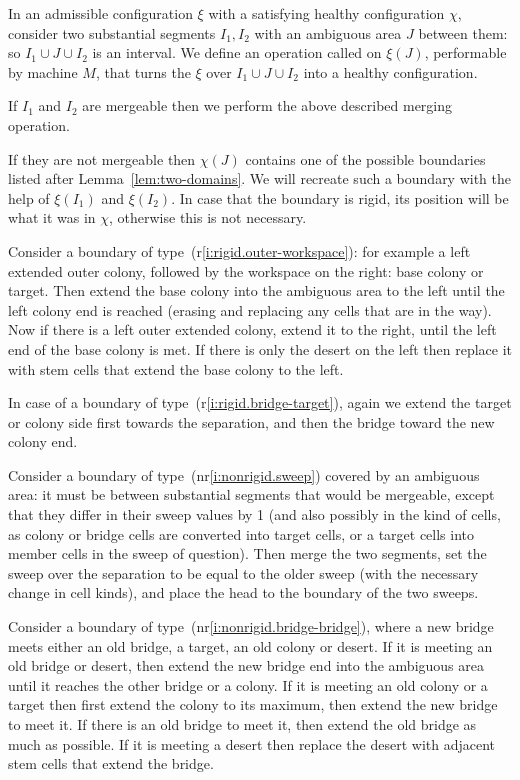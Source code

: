\documentclass[12pt]{memoir}
\begin{document}
\begin{definition}[Stitching]\label{def:stitching}
In an admissible configuration \( \xi \) with a satisfying healthy configuration \( \chi \),
consider two substantial segments \( I_{1},I_{2} \) with an ambiguous area \( J \) 
between them: so \( I_{1}\cup J\cup I_{2} \) is an interval.
We define an operation called 
on \( \xi(J) \), performable by machine \( M \), that turns the
\( \xi \) over  \( I_{1}\cup J\cup I_{2} \) into a healthy configuration.

If \( I_{1} \) and \( I_{2} \) are mergeable then we perform the above described merging operation.

If they are not mergeable then \( \chi(J) \) contains one of the possible boundaries
listed after Lemma~\ref{lem:two-domains}.
We will recreate such a boundary with the help of \( \xi(I_{1}) \) and \( \xi(I_{2}) \).
In case that the boundary is rigid, its position will be what it was in \( \chi \),
otherwise this is not necessary.

Consider a boundary of type~(r\ref{i:rigid.outer-workspace}): for example
a left extended outer colony, followed by the workspace on the right: base colony or target.
Then extend the base colony into the ambiguous area
to the left until the left colony end is reached
(erasing and replacing any cells that are in the way).
Now if there is a left outer extended colony, extend it to the right, until
the left end of the base colony is met.
If there is only the desert on the left then replace it with stem cells that extend the base
colony to the left.

In case of a boundary of type~(r\ref{i:rigid.bridge-target}),
again we extend the target or colony side first towards the separation,
and then the bridge toward the new colony end.

Consider a boundary of type~(nr\ref{i:nonrigid.sweep}) covered by an ambiguous
area: it must be between substantial segments that would be mergeable, except that they
differ in their sweep values by 1 (and also possibly in the kind of cells,
as colony or bridge cells are converted into target cells, or a target cells into member cells
in the sweep of question).
Then merge the two segments, set the sweep over the separation to be equal
to the older sweep (with the necessary change in cell kinds), 
and place the head to the boundary of the two sweeps.

Consider a boundary of type~(nr\ref{i:nonrigid.bridge-bridge}), where a new bridge
meets either an old bridge, a target, an old colony or desert.
If it is meeting an old bridge or desert, then
extend the new bridge end into the ambiguous area until it reaches the
other bridge or a colony.
If it is meeting an old colony or a target then first extend the colony to its maximum,
then extend the new bridge to meet it.
If there is an old bridge to meet it, then extend the old bridge as much as possible.
If it is meeting a desert then replace the desert with adjacent 
stem cells that extend the bridge.
\end{definition}
\end{document}
